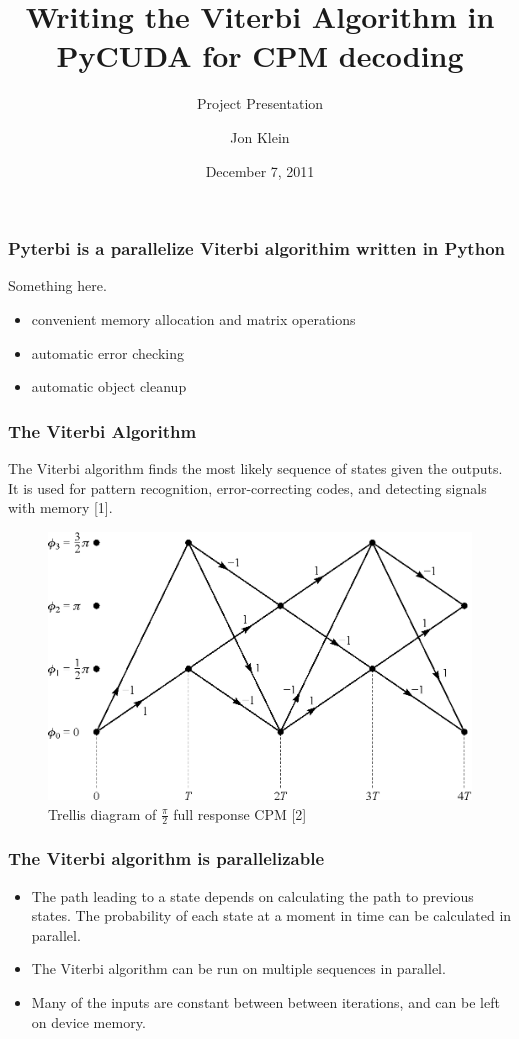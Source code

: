 \documentclass{beamer}
\title{Writing the Viterbi Algorithm in PyCUDA for CPM decoding}
\subtitle{Project Presentation}
\author{Jon Klein}
\institute{University of Alaska, Fairbanks}
\date{December 7, 2011}
\begin{document}
    \begin{frame}
        \titlepage
    \end{frame}

    \begin{frame}
        \frametitle{Pyterbi is a parallelize Viterbi algorithim written in Python}
        Something here.
        \begin{itemize}
            \item convenient memory allocation and matrix operations 
            \item automatic error checking
            \item automatic object cleanup
        \end{itemize}
    \end{frame}
 
    \begin{frame}
        \frametitle{The Viterbi Algorithm}
        The Viterbi algorithm finds the most likely sequence of states given the outputs.
        It is used for pattern recognition, error-correcting codes, and detecting signals with memory [1].

        \begin{figure}
            \includegraphics[options]{figures/cpmfulltrellis.jpg}
            \caption{Trellis diagram of $\frac{\pi}{2}$ full response CPM [2]}
        \end{figure}

    \end{frame}
    
    \begin{frame}
        \frametitle{The Viterbi algorithm is parallelizable}
        
        \begin{itemize}
            \item The path leading to a state depends on calculating the path to previous states. The probability of each state at a moment in time can be calculated in parallel.
            \item The Viterbi algorithm can be run on multiple sequences in parallel.
            \item Many of the inputs are constant between between iterations, and can be left on device memory.

        \end{itemize} 
    \end{frame}
    
\end{document}
